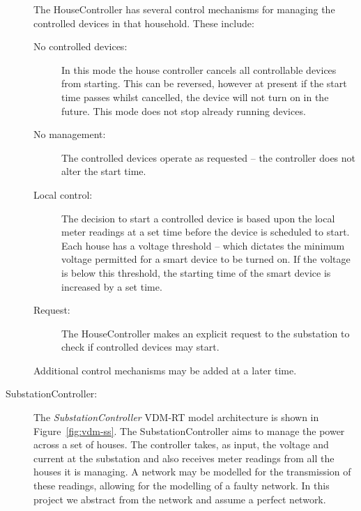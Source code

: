 \begin{description}
The HouseController has several control mechanisms for managing the controlled devices in that household. These include:
\begin{description}
\item[No controlled devices:] In this mode the house controller cancels all controllable devices from starting. This can be reversed, however at present if the start time passes whilst cancelled, the device will not turn on in the future. This mode does not stop already running devices.

\item[No management:] The controlled devices operate as requested -- the controller does not alter the start time.

\item[Local control:] The decision to start a controlled device is based upon the local meter readings at a set time before the device is scheduled to start. Each house has a voltage threshold -- which dictates the minimum voltage permitted for a smart device to be turned on. If the voltage is below this threshold, the starting time of the smart device is increased by a set time.

\item[Request:] The HouseController makes an explicit request to the substation to check if controlled devices may start.

%
\end{description}

Additional control mechanisms may be added at a later time.

\item[SubstationController:] The \emph{SubstationController} VDM-RT model architecture is shown in Figure~\ref{fig:vdm-ss}. The SubstationController aims to manage the power across a set of houses. The controller takes, as input, the voltage and current at the substation and also receives meter readings from all the houses it is managing. A network may be modelled for the transmission of these readings, allowing for the modelling of a faulty network. In this project we abstract from the network and assume a perfect network.


\end{description}
